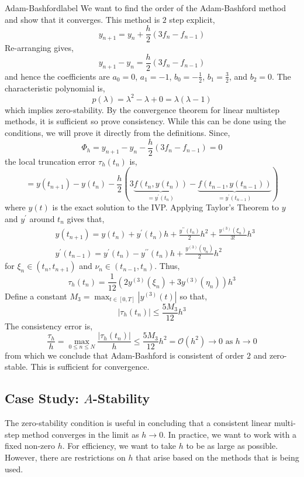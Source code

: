 \begin{ex}{Adam-Bashford}{label}
	We want to find the order of the Adam-Bashford method and show that it converges. This method is $2$ step explicit,
	\[y_{n+1}=y_n+\frac{h}{2}\left(3 f_n-f_{n-1}\right)\]
	Re-arranging gives,
	\[y_{n+1}-y_n=\frac{h}{2}\left(3 f_n-f_{n-1}\right)\]
	and hence the coefficients are $a_0 = 0$, $a_1 = -1$, $b_0 = -\frac{1}{2}$, $b_1 = \frac{3}{2}$, and $b_2 = 0$. The characteristic polynomial is,
	\[p(\lambda)=\lambda^2-\lambda+0=\lambda(\lambda-1)\]
	which implies zero-stability. By the convergence theorem for linear multistep methods, it is sufficient so prove consistency. While this can be done using the conditions, we will prove it directly from the definitions. Since,
	\[\Phi_h=y_{n+1}-y_n-\frac{h}{2}\left(3 f_n-f_{n-1}\right)=0\]
	the local truncation error $\tau_h\left(t_n\right)$ is,
	\[=y\left(t_{n+1}\right)-y\left(t_n\right)-\frac{h}{2} \left(3 \underbrace{f\left(t_n, y\left(t_n\right)\right)}_{=y^{\prime}\left(t_n\right)}-\underbrace{f\left(t_{n-1}, y\left(t_{n-1}\right)\right)}_{=y^{\prime}\left(t_{n-1}\right)}\right)\]
	where $y(t)$ is the exact solution to the IVP. Applying Taylor's Theorem to $y$ and $y^{\prime}$ around $t_n$ gives that,
	\begin{align*}
		&y\left(t_{n+1}\right)=y\left(t_n\right)+y^{\prime}\left(t_n\right) h+\frac{y^{\prime \prime}\left(t_n\right)}{2} h^2+\frac{y^{(3)}\left(\xi_n\right)}{3 !} h^3 \\
		&y^{\prime}\left(t_{n-1}\right)=y^{\prime}\left(t_n\right)-y^{\prime \prime}\left(t_n\right) h+\frac{y^{(3)}\left(\eta_n\right)}{2} h^2
	\end{align*}
	for $\xi_n \in (t_n, t_{n+1})$ and $\nu_n \in (t_{n-1}, t_n)$. Thus,
	\[\tau_h(t_n)=\frac{1}{12}\left(2 y^{(3)}\left(\xi_n\right)+3 y^{(3)}\left(\eta_n\right)\right) h^3\]
	Define a constant $M_3=\max _{t \in[0, T]}\left|y^{(3)}(t)\right|$ so that,
	\[\left|\tau_h\left(t_n\right)\right| \leq \frac{5 M_3}{12} h^3\]
	The consistency error is,
	\[\frac{\tau_h}{h}=\max _{0 \leq n \leq N} \frac{\left|\tau_h\left(t_n\right)\right|}{h} \leq \frac{5 M_3}{12} h^2=\mathcal{O}\left(h^2\right) \rightarrow 0 \text { as } h \rightarrow 0\]
	from which we conclude that Adam-Bashford is consistent of order $2$ and zero-stable. This is sufficient for convergence.
\end{ex}

\subsection{Case Study: $A$-Stability}
The zero-stability condition is useful in concluding that a consistent linear multi-step method converges in the limit as $h \rightarrow 0$. In practice, we want to work with a fixed non-zero $h$. For efficiency, we want to take $h$ to be as large as possible. However, there are restrictions on $h$ that arise based on the methods that is being used.

